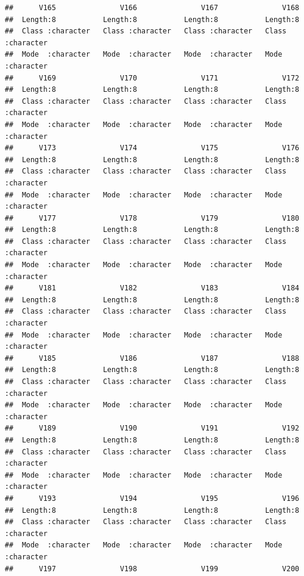 \documentclass[
]{article}
\begin{document}
\begin{verbatim}
##      V165               V166               V167               V168          
##  Length:8           Length:8           Length:8           Length:8          
##  Class :character   Class :character   Class :character   Class :character  
##  Mode  :character   Mode  :character   Mode  :character   Mode  :character  
##      V169               V170               V171               V172          
##  Length:8           Length:8           Length:8           Length:8          
##  Class :character   Class :character   Class :character   Class :character  
##  Mode  :character   Mode  :character   Mode  :character   Mode  :character  
##      V173               V174               V175               V176          
##  Length:8           Length:8           Length:8           Length:8          
##  Class :character   Class :character   Class :character   Class :character  
##  Mode  :character   Mode  :character   Mode  :character   Mode  :character  
##      V177               V178               V179               V180          
##  Length:8           Length:8           Length:8           Length:8          
##  Class :character   Class :character   Class :character   Class :character  
##  Mode  :character   Mode  :character   Mode  :character   Mode  :character  
##      V181               V182               V183               V184          
##  Length:8           Length:8           Length:8           Length:8          
##  Class :character   Class :character   Class :character   Class :character  
##  Mode  :character   Mode  :character   Mode  :character   Mode  :character  
##      V185               V186               V187               V188          
##  Length:8           Length:8           Length:8           Length:8          
##  Class :character   Class :character   Class :character   Class :character  
##  Mode  :character   Mode  :character   Mode  :character   Mode  :character  
##      V189               V190               V191               V192          
##  Length:8           Length:8           Length:8           Length:8          
##  Class :character   Class :character   Class :character   Class :character  
##  Mode  :character   Mode  :character   Mode  :character   Mode  :character  
##      V193               V194               V195               V196          
##  Length:8           Length:8           Length:8           Length:8          
##  Class :character   Class :character   Class :character   Class :character  
##  Mode  :character   Mode  :character   Mode  :character   Mode  :character  
##      V197               V198               V199               V200          

\end{verbatim}
\end{document}
